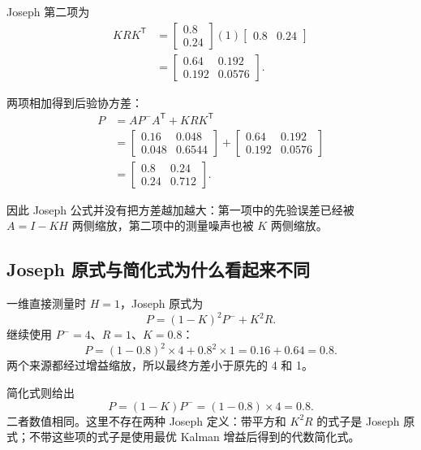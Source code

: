 \documentclass[UTF8,a4paper,11pt]{ctexart}
\newcommand{\prior}{^{-}}
\newcommand{\transpose}{^{\mathsf T}}
\begin{document}
Joseph 第二项为
\begin{align}
KRK\transpose
&=\begin{bmatrix}0.8\\0.24\end{bmatrix}
(1)
\begin{bmatrix}0.8&0.24\end{bmatrix}\\
&=\begin{bmatrix}0.64&0.192\\0.192&0.0576\end{bmatrix}.
\end{align}

两项相加得到后验协方差：
\begin{align}
P
&=AP\prior A\transpose+KRK\transpose\\
&=\begin{bmatrix}0.16&0.048\\0.048&0.6544\end{bmatrix}
+\begin{bmatrix}0.64&0.192\\0.192&0.0576\end{bmatrix}\\
&=\boxed{\begin{bmatrix}0.8&0.24\\0.24&0.712\end{bmatrix}}.
\end{align}

因此 Joseph 公式并没有把方差越加越大：第一项中的先验误差已经被 $A=I-KH$ 两侧缩放，第二项中的测量噪声也被 $K$ 两侧缩放。

\subsection{Joseph 原式与简化式为什么看起来不同}

一维直接测量时 $H=1$，Joseph 原式为
\begin{equation}
P=(1-K)^2P\prior+K^2R.
\end{equation}
继续使用 $P\prior=4$、$R=1$、$K=0.8$：
\begin{equation}
P=(1-0.8)^2\times4+0.8^2\times1=0.16+0.64=0.8.
\end{equation}
两个来源都经过增益缩放，所以最终方差小于原先的 4 和 1。

简化式则给出
\begin{equation}
P=(1-K)P\prior=(1-0.8)\times4=0.8.
\end{equation}
二者数值相同。这里不存在两种 Joseph 定义：带平方和 $K^2R$ 的式子是 Joseph 原式；不带这些项的式子是使用最优 Kalman 增益后得到的代数简化式。
\end{document}
